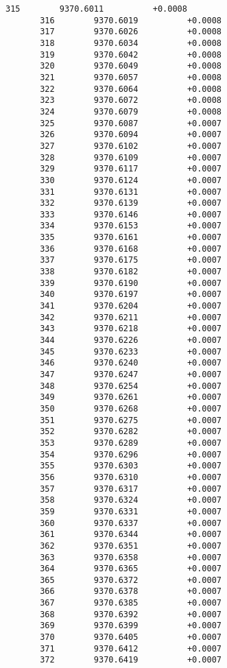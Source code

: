 \documentclass[11pt]{article}
\begin{document}
\begin{Verbatim}[commandchars=\\\{\}]
       315        9370.6011          +0.0008
       316        9370.6019          +0.0008
       317        9370.6026          +0.0008
       318        9370.6034          +0.0008
       319        9370.6042          +0.0008
       320        9370.6049          +0.0008
       321        9370.6057          +0.0008
       322        9370.6064          +0.0008
       323        9370.6072          +0.0008
       324        9370.6079          +0.0008
       325        9370.6087          +0.0007
       326        9370.6094          +0.0007
       327        9370.6102          +0.0007
       328        9370.6109          +0.0007
       329        9370.6117          +0.0007
       330        9370.6124          +0.0007
       331        9370.6131          +0.0007
       332        9370.6139          +0.0007
       333        9370.6146          +0.0007
       334        9370.6153          +0.0007
       335        9370.6161          +0.0007
       336        9370.6168          +0.0007
       337        9370.6175          +0.0007
       338        9370.6182          +0.0007
       339        9370.6190          +0.0007
       340        9370.6197          +0.0007
       341        9370.6204          +0.0007
       342        9370.6211          +0.0007
       343        9370.6218          +0.0007
       344        9370.6226          +0.0007
       345        9370.6233          +0.0007
       346        9370.6240          +0.0007
       347        9370.6247          +0.0007
       348        9370.6254          +0.0007
       349        9370.6261          +0.0007
       350        9370.6268          +0.0007
       351        9370.6275          +0.0007
       352        9370.6282          +0.0007
       353        9370.6289          +0.0007
       354        9370.6296          +0.0007
       355        9370.6303          +0.0007
       356        9370.6310          +0.0007
       357        9370.6317          +0.0007
       358        9370.6324          +0.0007
       359        9370.6331          +0.0007
       360        9370.6337          +0.0007
       361        9370.6344          +0.0007
       362        9370.6351          +0.0007
       363        9370.6358          +0.0007
       364        9370.6365          +0.0007
       365        9370.6372          +0.0007
       366        9370.6378          +0.0007
       367        9370.6385          +0.0007
       368        9370.6392          +0.0007
       369        9370.6399          +0.0007
       370        9370.6405          +0.0007
       371        9370.6412          +0.0007
       372        9370.6419          +0.0007

\end{Verbatim}
\end{document}
